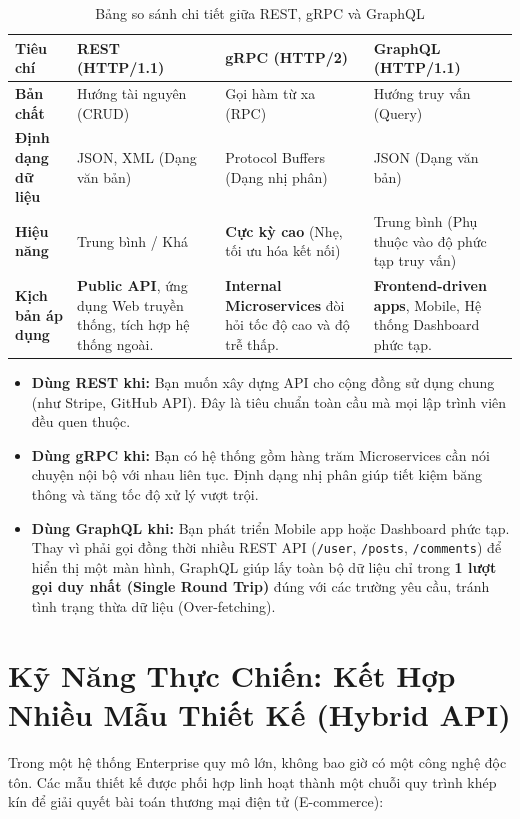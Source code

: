 \documentclass[12pt,a4paper]{article}
\begin{document}
\begin{table}[h!]
\centering
\caption{Bảng so sánh chi tiết giữa REST, gRPC và GraphQL}
\label{tab:api_comparison}
\begin{tabular}{p{3cm} p{4cm} p{4cm} p{4cm}}
\toprule
\textbf{Tiêu chí} & \textbf{REST (HTTP/1.1)} & \textbf{gRPC (HTTP/2)} & \textbf{GraphQL (HTTP/1.1)} \\ \midrule
\textbf{Bản chất} & Hướng tài nguyên (CRUD) & Gọi hàm từ xa (RPC) & Hướng truy vấn (Query) \\
\textbf{Định dạng dữ liệu} & JSON, XML (Dạng văn bản) & Protocol Buffers (Dạng nhị phân) & JSON (Dạng văn bản) \\
\textbf{Hiệu năng} & Trung bình / Khá & \textbf{Cực kỳ cao} (Nhẹ, tối ưu hóa kết nối) & Trung bình (Phụ thuộc vào độ phức tạp truy vấn) \\
\textbf{Kịch bản áp dụng} & \textbf{Public API}, ứng dụng Web truyền thống, tích hợp hệ thống ngoài. & \textbf{Internal Microservices} đòi hỏi tốc độ cao và độ trễ thấp. & \textbf{Frontend-driven apps}, Mobile, Hệ thống Dashboard phức tạp. \\ \bottomrule
\end{tabular}
\end{table}

\begin{itemize}
    \item \textbf{Dùng REST khi:} Bạn muốn xây dựng API cho cộng đồng sử dụng chung (như Stripe, GitHub API). Đây là tiêu chuẩn toàn cầu mà mọi lập trình viên đều quen thuộc.
    \item \textbf{Dùng gRPC khi:} Bạn có hệ thống gồm hàng trăm Microservices cần nói chuyện nội bộ với nhau liên tục. Định dạng nhị phân giúp tiết kiệm băng thông và tăng tốc độ xử lý vượt trội.
    \item \textbf{Dùng GraphQL khi:} Bạn phát triển Mobile app hoặc Dashboard phức tạp. Thay vì phải gọi đồng thời nhiều REST API (\texttt{/user}, \texttt{/posts}, \texttt{/comments}) để hiển thị một màn hình, GraphQL giúp lấy toàn bộ dữ liệu chỉ trong \textbf{1 lượt gọi duy nhất (Single Round Trip)} đúng với các trường yêu cầu, tránh tình trạng thừa dữ liệu (Over-fetching).
\end{itemize}

\section{Kỹ Năng Thực Chiến: Kết Hợp Nhiều Mẫu Thiết Kế (Hybrid API)}
Trong một hệ thống Enterprise quy mô lớn, không bao giờ có một công nghệ độc tôn. Các mẫu thiết kế được phối hợp linh hoạt thành một chuỗi quy trình khép kín để giải quyết bài toán thương mại điện tử (E-commerce):
\end{document}
